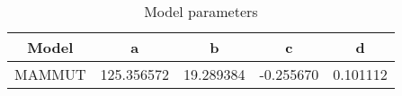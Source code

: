 \begin{table}
\centering
\begin{tabular}{|c||c|c|c|c|}
\hline
\textbf{Model} & \textbf{a} & \textbf{b} & \textbf{c} & \textbf{d} \\
\hline
MAMMUT & 125.356572 & 19.289384 & -0.255670 & 0.101112 \\
\hline
\end{tabular}
\caption{Model parameters}
\label{tab:coefficients}
\end{table}
